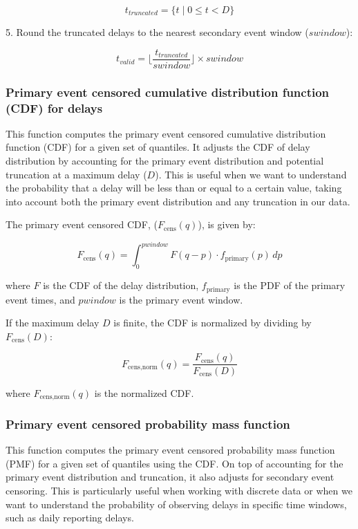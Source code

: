 \documentclass[10pt,letterpaper]{article}
\begin{document}
$$t_{truncated} = \{t \mid 0 \leq t < D\}$$

5. Round the truncated delays to the nearest secondary event window ($swindow$):

$$t_{valid} = \lfloor \frac{t_{truncated}}{swindow} \rfloor \times swindow$$

\subsubsection{Primary event censored cumulative distribution function (CDF) for delays}

This function computes the primary event censored cumulative distribution function (CDF) for a given set of quantiles. It adjusts the CDF of delay distribution by accounting for the primary event distribution and potential truncation at a maximum delay ($D$). This is useful when we want to understand the probability that a delay will be less than or equal to a certain value, taking into account both the primary event distribution and any truncation in our data.

The primary event censored CDF, ($F_{\text{cens}}(q)$), is given by:

$$
F_{\text{cens}}(q) = \int_{0}^{pwindow} F(q - p) \cdot f_{\text{primary}}(p) \, dp
$$

where $F$ is the CDF of the delay distribution, $f_{\text{primary}}$ is the PDF of the primary event times, and $pwindow$ is the primary event window.

If the maximum delay $D$ is finite, the CDF is normalized by dividing by $F_{\text{cens}}(D)$:

$$
F_{\text{cens,norm}}(q) = \frac{F_{\text{cens}}(q)}{F_{\text{cens}}(D)}
$$

where $F_{\text{cens,norm}}(q)$ is the normalized CDF.

\subsubsection{Primary event censored probability mass function}
This function computes the primary event censored probability mass function (PMF) for a given set of quantiles using the CDF. On top of accounting for the primary event distribution and truncation, it also adjusts for secondary event censoring. This is particularly useful when working with discrete data or when we want to understand the probability of observing delays in specific time windows, such as daily reporting delays.
\end{document}
